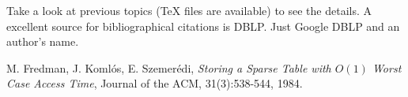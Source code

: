 \documentclass[11pt]{article}
\begin{document}
Take a look at previous topics (TeX files are available) to see the
details. A excellent source for bibliographical citations is
DBLP. Just Google DBLP and an author's name.


%


\begin{thebibliography}{77}

M. Fredman, J. Koml\'{o}s, E. Szemer\'{e}di,
\emph{Storing a Sparse Table with $O(1)$ Worst Case Access Time},
Journal of the ACM, 31(3):538-544, 1984.

\end{thebibliography}
\end{document}
